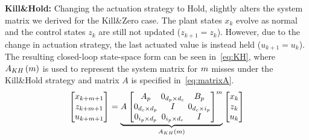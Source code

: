 \textbf{Kill\&Hold: }%
%
Changing the actuation strategy to Hold, slightly alters the 
system matrix we derived for the Kill\&Zero case. The plant states
$x_k$ evolve as normal and the control states $z_k$ are still not
updated ($z_{k+1} = z_k$). However, due to the change in
actuation strategy, the last actuated value is instead
held ($u_{k+1} = u_k$). The resulting closed-loop state-space
form can be seen in~\eqref{eq:KH}, where
$A_{KH}\left(m\right)$ is used to represent the system matrix
for $m$ misses under the Kill\&Hold strategy and
matrix $A$ is specified in~\eqref{eq:matrixA}.
%
\begin{equation}
    \setlength\arraycolsep{2pt}
    \label{eq:KH}
    \begin{bmatrix}
        x_{k+\nummisses+1} \\
        z_{k+\nummisses+1} \\
        u_{k+\nummisses+1}
    \end{bmatrix} = 
    \underbrace{ A \begin{bmatrix}
        A_p                                         & 0_{\numstatesplant \times \numstatesctl}  & B_p \\
        0_{\numstatesctl \times \numstatesplant}    & I                                         & 0_{\numstatesctl \times \numinputplant} \\
        0_{\numinputplant \times \numstatesplant}   & 0_{\numinputplant \times \numstatesctl}   & I
    \end{bmatrix}^{\nummisses}}_{A_{KH}\funof{\nummisses}}
    \begin{bmatrix}
        x_{k} \\
        z_{k} \\
        u_{k}
    \end{bmatrix}
\end{equation}

